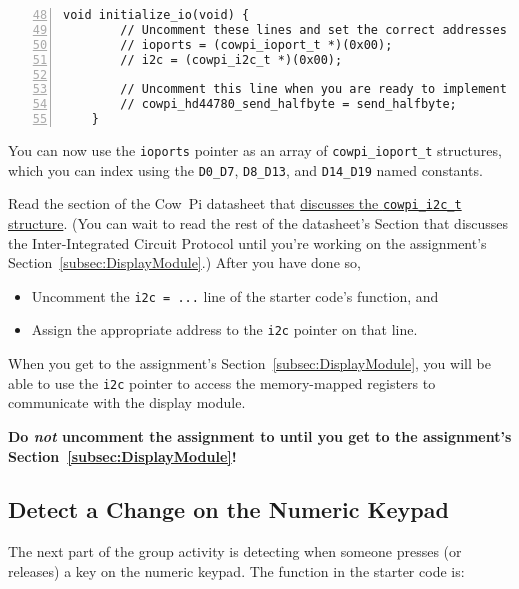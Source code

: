 \begin{lstlisting}[numberstyle=\color{gray}, numbers=left, firstnumber=48]
    void initialize_io(void) {
        // Uncomment these lines and set the correct addresses during lab time
        // ioports = (cowpi_ioport_t *)(0x00);
        // i2c = (cowpi_i2c_t *)(0x00);

        // Uncomment this line when you are ready to implement the `send_halfbyte()` function
        // cowpi_hd44780_send_halfbyte = send_halfbyte;
    }
\end{lstlisting}

You can now use the \lstinline{ioports} pointer as an array of \lstinline{cowpi_ioport_t} structures, which you can index using the \lstinline{D0_D7}, \lstinline{D8_D13}, and \lstinline{D14_D19} named constants.

Read the section of the Cow~Pi datasheet that \href{https://cow-pi.readthedocs.io/en/latest/microcontroller.html#atmega328ptwistruct}{discusses the \lstinline{cowpi_i2c_t} structure}.
(You can wait to read the rest of the datasheet's Section that discusses the Inter-Integrated Circuit Protocol until you're working on the assignment's Section~\ref{subsec:DisplayModule}.)
After you have done so,
\begin{itemize}
    \item Uncomment the \lstinline{i2c = ...} line of the starter code's  function, and
    \item Assign the appropriate address to the \lstinline{i2c} pointer on that line.
\end{itemize}

When you get to the assignment's Section~\ref{subsec:DisplayModule}, you will be able to use the \lstinline{i2c} pointer to access the memory-mapped registers to communicate with the display module.

\textbf{Do \textit{not} uncomment the assignment to  until you get to the assignment's Section~\ref{subsec:DisplayModule}!}


\subsection{Detect a Change on the Numeric Keypad} \label{subsec:detectKeyAction}

The next part of the group activity is detecting when someone presses (or releases) a key on the numeric keypad.
The  function in the starter code is:

